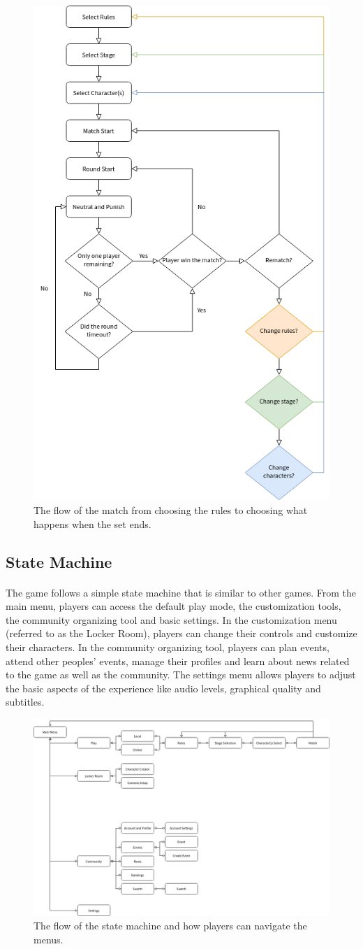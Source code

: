 \begin{figure}[h!]
    \centering
    \includegraphics[width=0.5\linewidth]{images/flow-match.png}
    \caption{The flow of the match from choosing the rules to choosing what happens when the set ends.}
\end{figure}

\subsection{State Machine}

\paragraph{} The game follows a simple state machine that is similar to other games. From the main menu, players can access the default play mode, the customization tools, the community organizing tool and basic settings. In the customization menu (referred to as the Locker Room), players can change their controls and customize their characters. In the community organizing tool, players can plan events, attend other peoples' events, manage their profiles and learn about news related to the game as well as the community. The settings menu allows players to adjust the basic aspects of the experience like audio levels, graphical quality and subtitles.

\begin{figure}[h!]
    \centering
    \includegraphics[width=0.75\linewidth]{images/flow-menu.png}
    \caption{The flow of the state machine and how players can navigate the menus.}
\end{figure}

